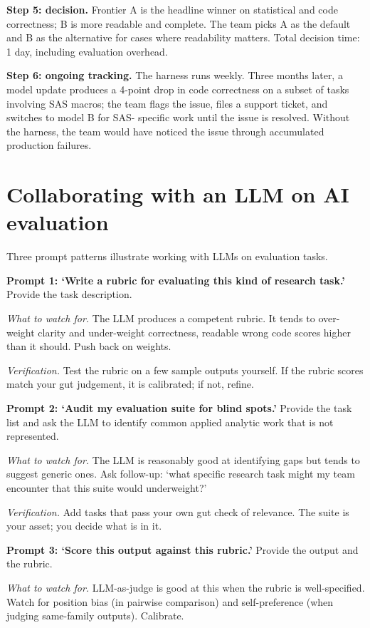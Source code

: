 \documentclass[
  letterpaper,
  11pt]{scrbook}
\begin{document}
\textbf{Step 5: decision.} Frontier A is the headline winner on
statistical and code correctness; B is more readable and complete. The
team picks A as the default and B as the alternative for cases where
readability matters. Total decision time: 1 day, including evaluation
overhead.

\textbf{Step 6: ongoing tracking.} The harness runs weekly. Three months
later, a model update produces a 4-point drop in code correctness on a
subset of tasks involving SAS macros; the team flags the issue, files a
support ticket, and switches to model B for SAS- specific work until the
issue is resolved. Without the harness, the team would have noticed the
issue through accumulated production failures.

\section{Collaborating with an LLM on AI
evaluation}\label{collaborating-with-an-llm-on-ai-evaluation}

Three prompt patterns illustrate working with LLMs on evaluation tasks.

\textbf{Prompt 1: `Write a rubric for evaluating this kind of research
task.'} Provide the task description.

\emph{What to watch for.} The LLM produces a competent rubric. It tends
to over-weight clarity and under-weight correctness, readable wrong code
scores higher than it should. Push back on weights.

\emph{Verification.} Test the rubric on a few sample outputs yourself.
If the rubric scores match your gut judgement, it is calibrated; if not,
refine.

\textbf{Prompt 2: `Audit my evaluation suite for blind spots.'} Provide
the task list and ask the LLM to identify common applied analytic work
that is not represented.

\emph{What to watch for.} The LLM is reasonably good at identifying gaps
but tends to suggest generic ones. Ask follow-up: `what specific
research task might my team encounter that this suite would
underweight?'

\emph{Verification.} Add tasks that pass your own gut check of
relevance. The suite is your asset; you decide what is in it.

\textbf{Prompt 3: `Score this output against this rubric.'} Provide the
output and the rubric.

\emph{What to watch for.} LLM-as-judge is good at this when the rubric
is well-specified. Watch for position bias (in pairwise comparison) and
self-preference (when judging same-family outputs). Calibrate.
\end{document}
